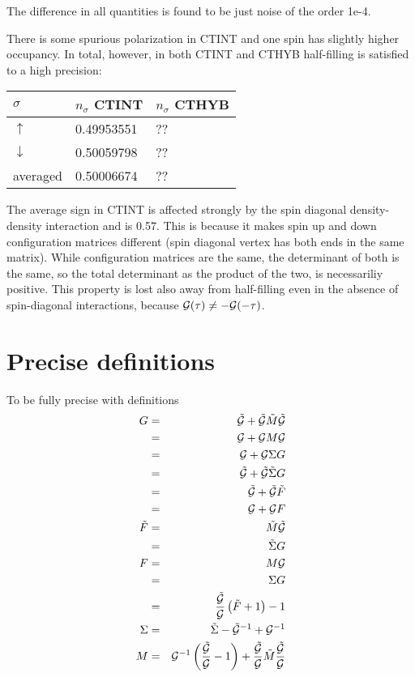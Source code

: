 \documentclass[a4paper,10pt]{article}
\begin{document}
The difference in all quantities is found to be just noise of the order 1e-4.

There is some spurious polarization in CTINT and one spin has slightly higher occupancy. In total, however, in both CTINT and CTHYB half-filling is satisfied to a high precision:
\begin{center}
    \begin{tabular}{| l | l | l |}
    \hline
    $\sigma$ & $n_\sigma$ CTINT & $n_\sigma$ CTHYB  \\ \hline
    $\uparrow$ & 0.49953551 & ?? \\ \hline
    $\downarrow$ & 0.50059798 & ??  \\ \hline
    averaged & 0.50006674 & ?? \\
    \hline
    \end{tabular}
\end{center}

The average sign in CTINT is affected strongly by the spin diagonal density-density interaction and is 0.57. This is because it makes spin up and down configuration matrices different (spin diagonal vertex has both ends in the same matrix). While configuration matrices are the same, the determinant of both is the same, so the total determinant as the product of the two, is necessariliy positive. This property is lost also away from half-filling even in the absence of spin-diagonal interactions, because ${\cal G}(\tau)\neq-{\cal G}(-\tau)$.

%

\appendix

\section{Precise definitions}

To be fully precise with definitions
\begin{eqnarray}
  G &=& \tilde{\cal G} + \tilde{\cal G} \tilde{M} \tilde{\cal G} \\
    &=& {\cal G} + {\cal G} M {\cal G} \\
    &=& {\cal G} + {\cal G} \Sigma G \\
    &=& \tilde{\cal G} + \tilde{\cal G} \tilde\Sigma G \\
    &=& \tilde{\cal G} + \tilde{\cal G} \tilde{F} \\
    &=& {\cal G} + {\cal G} F \\    
 \tilde{F} &=& \tilde{M} \tilde{\cal G} \\  
          &=& \tilde{\Sigma} G \\  
 F &=& M {\cal G} \\  
   &=& \Sigma G \\  
   &=& \frac{\tilde{\cal G}}{{\cal G}}\left(\tilde{F}+1\right) - 1  \\
 \Sigma &=& \tilde{\Sigma} - \tilde{\cal G}^{-1} + {\cal G}^{-1} \\
 M &=& {\cal G}^{-1}\left(\frac{\tilde{\cal G}}{\cal G} - 1 \right) + \frac{\tilde{\cal G}}{\cal G} \tilde{M} \frac{\tilde{\cal G}}{\cal G} 
\end{eqnarray}
\end{document}
